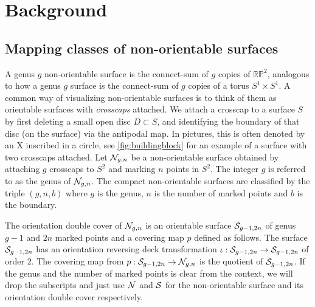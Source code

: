 \section{Background}
\label{sec:background}

\subsection{Mapping classes of non-orientable surfaces}
\label{sec:mapping-classes-non}

A genus $g$ non-orientable surface is the connect-sum of $g$ copies of
$\mathbb{RP}^2$, analogous to how a genus $g$ surface is the connect-sum of $g$ copies of a torus
$S^1 \times S^1$.  A common way of visualizing non-orientable surfaces is to think of them as orientable
surfaces with \emph{crosscaps} attached. We attach a crosscap to a surface $S$ by first deleting a small open disc $D\subset S$, and
identifying the boundary of that disc (on the surface) via the antipodal map. In pictures, this is often denoted by
an X inscribed in a circle, see \autoref{fig:buildingblock} for an example of a surface with two crosscaps
attached.  Let $\mathcal{N}_{g,n}$ be a non-orientable surface obtained by attaching $g$ crosscaps to $S^2$ and marking $n$ points in $S^2$.  The integer $g$ is referred to as the genus of $\mathcal{N}_{g,n}$.  The compact non-orientable surfaces are classified by the triple $(g,n,b)$ where $g$ is the genus, $n$ is the number of marked points and $b$ is the boundary.

 The orientation double cover of $\mathcal{N}_{g,n}$ is an orientable surface $\mathcal{S}_{g-1, 2n}$ of genus $g-1$ and $2n$ marked points and a covering map $p$ defined as follows. The surface $\mathcal{S}_{g-1,2n}$ has an orientation reversing deck transformation $\iota: \mathcal{S}_{g-1, 2n} \to \mathcal{S}_{g-1,
  2n}$ of order 2. The covering map from $p:\mathcal{S}_{g-1,2n}\to \mathcal{N}_{g,n}$ is the quotient of $\mathcal{S}_{g-1,2n}$. If the genus and the
number of marked points is clear from the context, we will drop the subscripts and just use
$\mathcal{N}$ and $\mathcal{S}$ for the non-orientable surface and its orientation double cover respectively.


